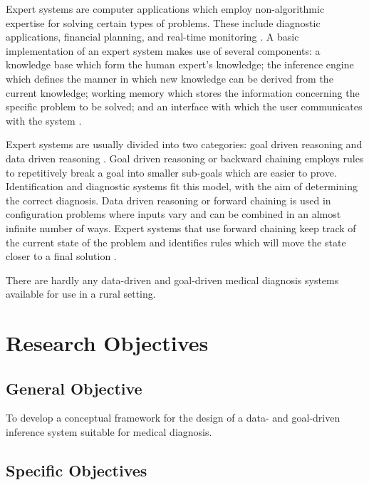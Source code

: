 Expert systems are computer applications which employ non-algorithmic expertise for solving certain types of problems.
These include diagnostic applications, financial planning, and real-time monitoring \cite{Merritt:2010}.
A basic implementation of an expert system makes use of several components:
a knowledge base which form the human expert's knowledge; 
the inference engine which defines the manner in which new knowledge can be derived from the current knowledge; 
working memory which stores the information concerning the specific problem to be solved; 
and an interface with which the user communicates with the system \cite{Agarwal:2014}. 

Expert systems are usually divided into two categories: goal driven reasoning and data driven reasoning \cite{Merritt:2010}. 
Goal driven reasoning or backward chaining employs rules to repetitively break a goal into smaller sub-goals which are easier to prove. 
Identification and diagnostic systems fit this model, with the aim of determining the correct diagnosis. 
Data driven reasoning or forward chaining is used in configuration problems where inputs vary and can be combined in an almost infinite number of ways. 
Expert systems that use forward chaining keep track of the current state of the problem and identifies rules which will move the state closer to a final solution .

There are hardly any data-driven and goal-driven medical diagnosis systems available for use in a rural setting.

\section{Research Objectives}
\label{sec:researchobjectives}

\subsection{General Objective}
\label{sec:generalobjective}

To develop a conceptual framework for the design of a data- and goal-driven inference system suitable for medical diagnosis.

\subsection{Specific Objectives}
\label{sec:specificobjectives}

